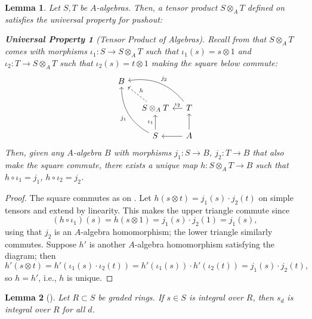 \documentclass[12pt,letterpaper]{article}
\newtheorem*{universalproperty}{Universal Property}
\newtheorem{lemma}{Lemma}[section]
\theoremstyle{definition}
\theoremstyle{remark}
\numberwithin{equation}{section}
\numberwithin{figure}{problem}
\begin{document}
\begin{lemma}\label{tpalg}
  Let $S,T$ be $A$-algebras. Then, a tensor product $S \otimes_A T$ defined on \emph{\cite[p.~30--31]{AM69}} satisfies the universal property for pushout:
  \begin{universalproperty}[Tensor Product of Algebras]
    Recall from \emph{\cite[p.~30--31]{AM69}} that $S \otimes_A T$ comes with morphisms $\iota_1\colon S \to S \otimes_A T$ such that $\iota_1(s) = s \otimes 1$ and $\iota_2\colon T \to S \otimes_A T$ such that $\iota_2(s) = t \otimes 1$ making the square below commute:
    \begin{equation*}
      \begin{tikzcd}[column sep=small]
        B\arrow[bend left,leftarrow]{drr}{j_2}\arrow[bend right,leftarrow]{ddr}[swap]{j_1}\arrow[dashed,leftarrow]{dr}{h}\\
        &S \otimes_A T\dar[swap,leftarrow]{\iota_1} \rar[leftarrow]{\iota_2} & T\dar[leftarrow]\\
        &S \rar[leftarrow] & A
      \end{tikzcd}
    \end{equation*}
    Then, given any $A$-algebra $B$ with morphisms $j_1\colon S \to B$, $j_2\colon T \to B$ that also make the square commute, there exists a unique map $h\colon S \otimes_A T \to B$ such that $h \circ \iota_1 = j_1$, $h \circ \iota_2 = j_2$.
  \end{universalproperty}
\end{lemma}
\begin{proof}
  The square commutes as on \cite[p.~31]{AM69}. Let $h(s \otimes t) = j_1(s) \cdot j_2(t)$ on simple tensors and extend by linearity. This makes the upper triangle commute since
  \begin{equation*}
    (h \circ \iota_1)(s) = h(s \otimes 1) = j_1(s) \cdot j_2(1) = j_1(s),
  \end{equation*}
  using that $j_2$ is an $A$-algebra homomorphism; the lower triangle similarly commutes. Suppose $h'$ is another $A$-algebra homomorphism satisfying the diagram; then
  \begin{equation*}
    h'(s \otimes t) = h'(\iota_1(s) \cdot \iota_2(t)) = h'(\iota_1(s)) \cdot h'(\iota_2(t)) = j_1(s) \cdot j_2(t),
  \end{equation*}
  so $h = h'$, i.e., $h$ is unique.
\end{proof}
\begin{lemma}[{\cite[Thm.~2.3.2]{HS06}}]\label{gradedic}
  Let $R \subset S$ be graded rings. If $s \in S$ is integral over $R$, then $s_d$ is integral over $R$ for all $d$.
\end{lemma}
\end{document}
